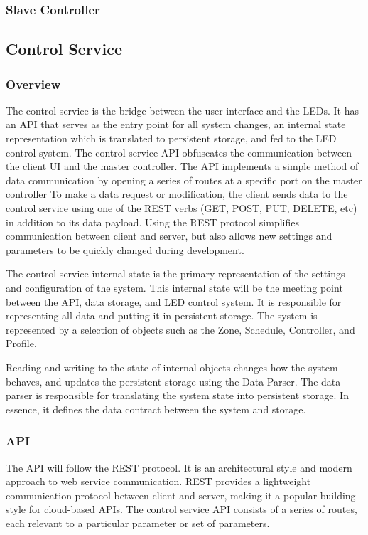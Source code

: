 \documentclass[onecolumn, draftclsnofoot,10pt, compsoc]{IEEEtran}
\begin{document}
			\subsubsection{Slave Controller}


		\subsection{Control Service}
			\subsubsection{Overview}
			The control service is the bridge between the user interface and the LEDs.
			It has an API that serves as the entry point for all system changes, an internal state representation which is translated to persistent storage, and fed to the LED control system.
			The control service API obfuscates the communication between the client UI and the master controller.
			The API implements a simple method of data communication by opening a series of routes at a specific port on the master controller
			To make a data request or modification, the client sends data to the control service using one of the REST verbs (GET, POST, PUT, DELETE, etc) in addition to its data payload.
			Using the REST protocol simplifies communication between client and server, but also allows new settings and parameters to be quickly changed during development.

			The control service internal state is the primary representation of the settings and configuration of the system.
			This internal state will be the meeting point between the API, data storage, and LED control system.
			It is responsible for representing all data and putting it in persistent storage.
			The system is represented by a selection of objects such as the Zone, Schedule, Controller, and Profile.

			Reading and writing to the state of internal objects changes how the system behaves, and updates the persistent storage using the Data Parser.
			The data parser is responsible for translating the system state into persistent storage.
			In essence, it defines the data contract between the system and storage.

			\subsubsection{API}
			The API will follow the REST protocol. It is an architectural style and modern approach to web service communication. \cite{rest1}
			REST provides a lightweight communication protocol between client and server, making it a popular building style for cloud-based APIs.
			The control service API consists of a series of routes, each relevant to a particular parameter or set of parameters.
\end{document}
